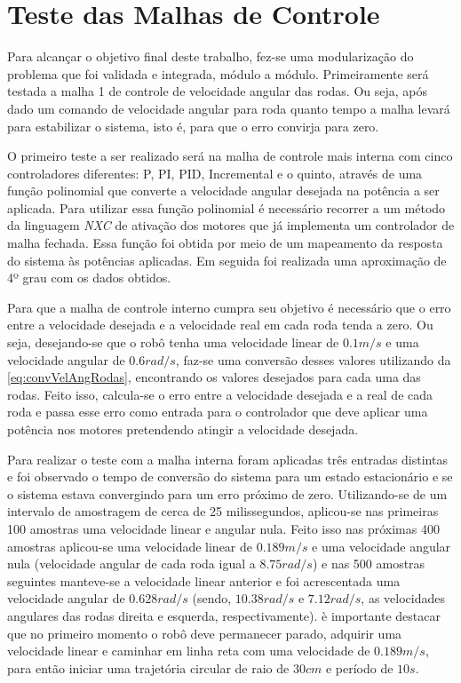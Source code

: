\chapter{Teste das Malhas de Controle}
\label{chap:testesMalhas}
Para alcançar o objetivo final deste trabalho, fez-se uma modularização do problema que foi validada e integrada, módulo a módulo. Primeiramente será testada a malha 1 de controle de velocidade angular das rodas. Ou seja, após dado um comando de velocidade angular para roda quanto tempo a malha levará para estabilizar o sistema, isto é, para que o erro convirja para zero. 

O primeiro teste a ser realizado será na malha de controle mais interna com cinco controladores diferentes: P, PI, PID, Incremental e o quinto, através de uma função polinomial que converte a velocidade angular desejada na potência a ser aplicada. Para utilizar essa função polinomial é necessário recorrer a um método da linguagem \emph{NXC} de ativação dos motores que já implementa um controlador de malha fechada. Essa função foi obtida por meio de um mapeamento da resposta do sistema às potências aplicadas. Em seguida foi realizada uma aproximação de 4º grau com os dados obtidos.

Para que a malha de controle interno cumpra seu objetivo é necessário que o erro entre a velocidade desejada e a velocidade real em cada roda tenda a zero. Ou seja, desejando-se que o robô tenha uma velocidade linear de $0.1 m/s$ e uma velocidade angular de $0.6 rad/s$, faz-se uma conversão desses valores utilizando da \autoref{eq:convVelAngRodas}, encontrando os valores desejados para cada uma das rodas. Feito isso, calcula-se o erro entre a velocidade desejada e a real de cada roda e passa esse erro como entrada para o controlador que deve aplicar uma potência nos motores pretendendo atingir a velocidade desejada.

Para realizar o teste com a malha interna foram aplicadas três entradas distintas e foi observado o tempo de conversão do sistema para um estado estacionário e se o sistema estava convergindo para um erro próximo de zero. Utilizando-se de um intervalo de amostragem de cerca de 25 milissegundos, aplicou-se nas primeiras 100 amostras uma velocidade linear e angular nula. Feito isso nas próximas 400 amostras aplicou-se uma velocidade linear de $0.189 m/s$ e uma velocidade angular nula (velocidade angular de cada roda igual a $8.75 rad/s$) e nas 500 amostras seguintes manteve-se a velocidade linear anterior e foi acrescentada uma velocidade angular de $0.628 rad/s$ (sendo, $10.38 rad/s$ e $7.12 rad/s$, as velocidades angulares das rodas direita e esquerda, respectivamente). è importante destacar que no primeiro momento o robô deve permanecer parado, adquirir uma velocidade linear e caminhar em linha reta com uma velocidade de $0.189 m/s$, para então iniciar uma trajetória circular de raio de $30 cm$ e período de $10 s$.

